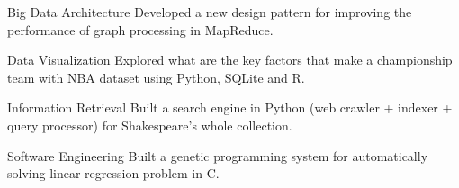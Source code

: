 \begin{cvskills}

  \cvskill
    {Big Data Architecture} %
    {Developed a new design pattern for improving the performance of graph
    processing in MapReduce.} %

  \cvskill
    {Data Visualization} %
    {Explored what are the key factors that make a championship team
    with NBA dataset using Python, SQLite and R.} %

  \cvskill
    {Information Retrieval} %
    {Built a search engine in Python (web crawler + indexer + query
    processor) for Shakespeare's whole collection.} %

  \cvskill
    {Software Engineering} %
    {Built a genetic programming system for automatically solving
    linear regression problem in C.}

\end{cvskills}
